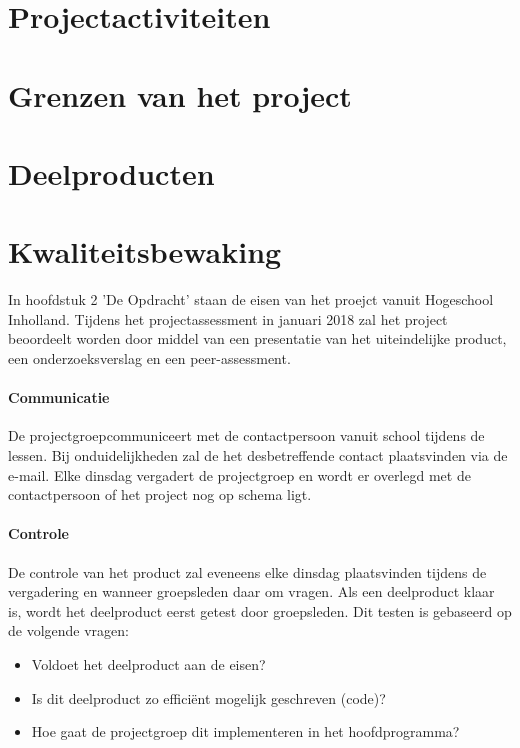 \documentclass[11pt]{article}
\begin{document}
\section{Projectactiviteiten}
\newpage
\section[Grenzen] {Grenzen van het project}
\newpage
\section{Deelproducten}
\newpage
\section{Kwaliteitsbewaking}

	

\begin{flushleft}
In hoofdstuk 2 'De Opdracht' staan de eisen van het proejct vanuit Hogeschool Inholland. Tijdens het projectassessment in januari 2018 zal het project beoordeelt worden door middel van een presentatie van het uiteindelijke product, een onderzoeksverslag en een peer-assessment.
\end{flushleft}
\paragraph{Communicatie}
\begin{flushleft}
De projectgroepcommuniceert met de contactpersoon vanuit school tijdens de lessen. Bij onduidelijkheden zal de het desbetreffende contact plaatsvinden via de e-mail. Elke dinsdag vergadert de projectgroep en wordt er overlegd met de contactpersoon of het project nog op schema ligt. 
\end{flushleft}
\paragraph{Controle}
\begin{flushleft}
De controle van het product zal eveneens elke dinsdag plaatsvinden tijdens de vergadering en wanneer groepsleden daar om vragen. Als een deelproduct klaar is, wordt het deelproduct eerst getest door groepsleden. Dit testen is gebaseerd op de volgende vragen:
\begin{itemize}
	\item Voldoet het deelproduct aan de eisen?
	\item Is dit deelproduct zo efficiënt mogelijk geschreven (code)?
	\item Hoe gaat de projectgroep dit implementeren in het hoofdprogramma?
\end{itemize}
\end{flushleft}
\end{document}
